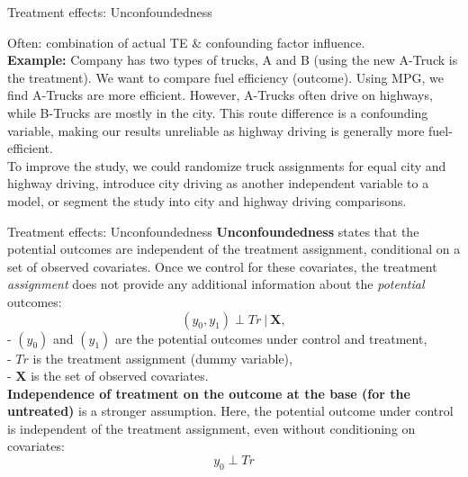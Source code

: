 \documentclass{beamer}
\begin{document}
\begin{frame}{Treatment effects: Unconfoundedness}
\begin{center}
\end{center}
%
\begin{center}
\end{center}
Often: combination of actual TE \& confounding factor influence.\\
\bigskip
\small  
\textbf{Example:} Company has two types of trucks, A and B (using the new A-Truck is the treatment). We want to compare fuel efficiency (outcome). Using MPG, we find A-Trucks are more efficient. However, A-Trucks often drive on highways, while B-Trucks are mostly in the city. This route difference is a confounding variable, making our results unreliable as highway driving is generally more fuel-efficient. \\
\smallskip
To improve the study, we could randomize truck assignments for equal city and highway driving, introduce city driving as another independent variable to a model, or segment the study into city and highway driving comparisons.
\end{frame}
\begin{frame}{Treatment effects: Unconfoundedness}
\textbf{Unconfoundedness} states that the potential outcomes are independent of the treatment assignment, conditional on a set of observed covariates. Once we control for these covariates, the treatment \emph{assignment} does not provide any additional information about the \emph{potential} outcomes:
$$
(y_0, y_1) \perp  \textit{Tr} ~|~ \bm{X},
$$
- $(y_0)$ and $(y_1)$ are the potential outcomes under control and treatment,\\
- $\textit{Tr}$ is the treatment assignment (dummy variable), \\
- $\bm{X}$ is the set of observed covariates. \\
\bigskip
\textbf{Independence of treatment on the outcome at the base (for the untreated)} is a stronger assumption. Here, the potential outcome under control is independent of the treatment assignment, even without conditioning on covariates:
$$
y_0 \perp \textit{Tr}
$$
\end{frame}
\end{document}
